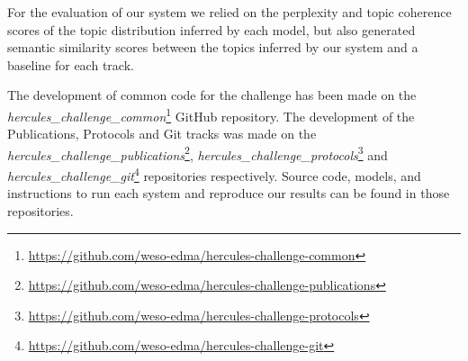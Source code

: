 \documentclass[runningheads]{llncs}
\begin{document}
For the evaluation of our system we relied on the perplexity and topic coherence scores of the topic distribution inferred by each model, but also generated semantic similarity scores between the topics inferred by our system and a baseline for each track.

The development of common code for the challenge has been made on the \textit{hercules\_challenge\_common}\footnote{\url{https://github.com/weso-edma/hercules-challenge-common}} GitHub repository. The development of the Publications, Protocols and Git tracks was made on the \textit{hercules\_challenge\_publications}\footnote{\url{https://github.com/weso-edma/hercules-challenge-publications}}, \textit{hercules\_challenge\_protocols}\footnote{\url{https://github.com/weso-edma/hercules-challenge-protocols}} and \textit{hercules\_challenge\_git}\footnote{\url{https://github.com/weso-edma/hercules-challenge-git}} repositories respectively. Source code, models, and instructions to run each system and reproduce our results can be found in those repositories.



\end{document}
